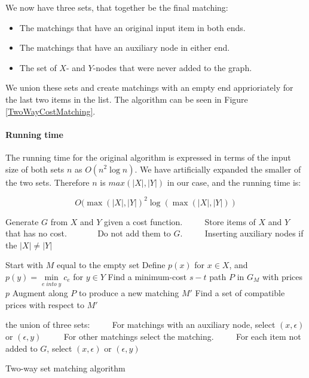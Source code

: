 \documentclass[11pt]{article}
\begin{document}
\endgroup

We now have three sets, that together be the final matching:
\begin{itemize}
   \item The matchings that have an original input item in both ends.
   \item The matchings that have an auxiliary node in either end.
   \item The set of $X$- and $Y$-nodes that were never added to the graph.
\end{itemize}

We union these sets and create matchings with an empty end apprioriately for the last two items in the list. The algorithm can be seen in Figure \ref{TwoWayCostMatching}.

\paragraph{Running time} The running time for the original algorithm is expressed in terms of the input size of both sets $n$ as $O(n^2 \log n)$. We have artificially expanded the smaller of the two sets. Therefore $n$ is $max(|X|, |Y|)$ in our case, and the running time is:

\begin{equation}
O(\max(|X|, |Y|)^2 \log (\max(|X|, |Y|)) \nonumber
\end{equation}


\begin{algorithm}
\begin{algorithmic}
	\State Generate $G$ from $X$ and $Y$ given a cost function.
	\State ~~~~ Store items of $X$ and $Y$ that has no cost.
	\State ~~~~~~ Do not add them to $G$.
	\State ~~~~ Inserting auxiliary nodes if the $|X| \neq |Y|$


	\State Start with $M$ equal to the empty set
	\State Define $p(x)$ for $x \in X$, and  $p(y) = \underset{e \; into \; y}{\operatorname{min}} c_e$ for $y \in Y$
    	\State Find a minimum-cost $s-t$ path $P$ in $G_M$ with prices $p$
    	\State Augment along $P$ to produce a new matching $M'$
    	\State Find a set of compatible prices with respect to $M'$
    \EndWhile
    

	\Return the union of three sets:
    \State ~~~~ For matchings with an auxiliary node, select $(x, \epsilon)$ or $(\epsilon, y)$
    \State ~~~~ For other matchings select the matching.
    \State ~~~~ For each item not added to $G$, select $(x, \epsilon)$ or $(\epsilon, y)$    
\EndFunction
\end{algorithmic}
\caption{Two-way set matching algorithm}
\label{TwoWayCostMatching}
\end{algorithm}
\end{document}
